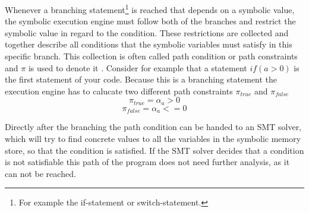 Whenever a branching statement\footnote{For example the if-statement or switch-statement.} is reached that depends on a symbolic value, the symbolic execution engine must follow both of the branches and restrict the symbolic value in regard to the condition. These restrictions are collected and together describe all conditions that the symbolic variables must satisfy in this specific branch. This collection is often called path condition or path constraints and $\pi$ is used to denote it \cite{SurveySymExec-CSUR18}.
Consider for example that a statement $if (a > 0)$ is the first statement of your code. Because this is a branching statement the execution engine has to calucate two different path constraints $\pi_{true}$ and $\pi_{false}$
$$\pi_{true} = \alpha_a > 0$$
$$\pi_{false} = \alpha_a <= 0$$

Directly after the branching the path condition can be handed to an SMT solver, which will try to find concrete values to all the variables in the symbolic memory store, so that the condition is satisfied. If the SMT solver decides that a condition is not satisfiable this path of the program does not need further analysis, as it can not be reached.
